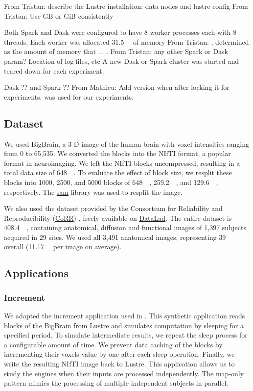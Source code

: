 \documentclass[conference]{IEEEtran}
\newcommand{\TG}[1]{\color{cyan}From Tristan: #1 \color{black}}
\newcommand{\MD}[1]{\color{magenta}From Mathieu: #1 \color{black}}
\begin{document}
\TG{describe the Lustre installation: data nodes and lustre config}
\TG{Use GB or GiB consistently}

Both Spark and Dask were configured to have 8 worker processes each with 8
threads. Each worker was allocated \SI{31.5}{\giga\byte} of memory \TG{,
determined as the amount of memory that ...}. \TG{any other Spark or Dask
param? Location of log files, etc} A new Dask or Spark cluster was started and
teared down for each experiment.

Dask ?? and Spark ?? \MD{Add version when after locking it for experiments.} was used for our experiments.

\subsection{Dataset}
We used BigBrain\cite{Amunts:13}, a 3-D image of the human brain with voxel
intensities ranging from 0 to 65,535. We converted the blocks into the
NIfTI format, a popular format in neuroimaging. We left the NIfTI blocks
uncompressed, resulting in a total data size of \SI{648}{\giga\byte}. To
evaluate the effect of block size, we resplit these blocks into 1000, 2500,
and 5000 blocks of \SI{648}{\mega\byte}, \SI{259.2}{\mega\byte}, and
\SI{129.6}{\mega\byte}, respectively. The
\href{https://github.com/big-data-lab-team/sam}{sam} library was used to
resplit the image.

We also used the dataset provided by the Consortium for Reliability and
Reproducibility
(\href{http://fcon_1000.projects.nitrc.org/indi/CoRR/html/}{CoRR})
\cite{zuo2014open}, freely available on
\href{https://datasets.datalad.org/?dir=/corr/RawDataBIDS}{DataLad}. The
entire dataset is \SI{408.4}{\giga\byte}, containing anatomical, diffusion
and functional images of 1,397 subjects acquired in 29 sites. We used all
3,491 anatomical images, representing \SI{39}{\giga\byte} overall
(\SI{11.17}{\mega\byte} per image on average).

\subsection{Applications}

\subsubsection{Increment}

We adapted the increment application used in \cite{hayot2019performance}.
This synthetic application reads blocks of the BigBrain from Lustre and
simulates computation by sleeping for a specified period. To simulate
intermediate results, we repeat the sleep process for a configurable amount
of time. We prevent data caching of the blocks by incrementing their voxels
value by one after each sleep operation. Finally, we write the resulting
NIfTI image back to Lustre. This application allows us to study the engines
when their inputs are processed independently. The map-only pattern
 mimics the processing of multiple independent subjects in
parallel.
\end{document}
